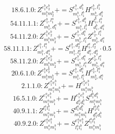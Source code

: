 \documentclass[letterpaper,10pt,fleqn,leqno,onecolumn]{article}
\begin{document}
\begin{equation} \;\;\;\;\;\;  18.6.1.0: Z^{e_{1}^{b}e_{2}^{b}}_{m_{1}^{b}m_{2}^{b}}+=S^{e_{1}^{b},d_{1}^{b}}_{m_{1}^{b},l_{1}^{b}}H^{e_{2}^{b},l_{1}^{b}}_{m_{2}^{b},d_{1}^{b}} \end{equation}
\begin{equation} \;\;\;\;\;\;  54.11.1.1: Z^{e_{1}^{b},l_{1}^{a}}_{m_{1}^{b},d_{1}^{a}}+=S^{e_{1}^{b},d_{1}^{b}}_{m_{1}^{b},l_{1}^{b}}H^{l_{1}^{b},l_{1}^{a}}_{d_{1}^{b},d_{1}^{a}} \end{equation}
\begin{equation} \;\;\;\;\;\;  54.11.2.0: Z^{e_{1}^{b}e_{2}^{b}}_{m_{1}^{b}m_{2}^{b}}+=S^{e_{1}^{b},d_{1}^{a}}_{m_{1}^{b},l_{1}^{a}}Z^{e_{2}^{b},l_{1}^{a}}_{m_{2}^{b},d_{1}^{a}} \end{equation}
\begin{equation} \;\;\;\;\;\;  58.11.1.1: Z^{e_{1}^{b},l_{1}^{a}}_{m_{1}^{b},d_{1}^{a}}+=S^{e_{1}^{b},d_{2}^{a}}_{m_{1}^{b},l_{2}^{a}}H^{l_{1}^{a},l_{2}^{a}}_{d_{1}^{a},d_{2}^{a}}\cdot 0.5 \end{equation}
\begin{equation} \;\;\;\;\;\;  58.11.2.0: Z^{e_{1}^{b}e_{2}^{b}}_{m_{1}^{b}m_{2}^{b}}+=S^{e_{1}^{b},d_{1}^{a}}_{m_{1}^{b},l_{1}^{a}}Z^{e_{2}^{b},l_{1}^{a}}_{m_{2}^{b},d_{1}^{a}} \end{equation}
\begin{equation} \;\;\;\;\;\;  20.6.1.0: Z^{e_{1}^{b}e_{2}^{b}}_{m_{1}^{b}m_{2}^{b}}+=S^{e_{1}^{b},d_{1}^{a}}_{m_{1}^{b},l_{1}^{a}}H^{e_{2}^{b},l_{1}^{a}}_{m_{2}^{b},d_{1}^{a}} \end{equation}
\begin{equation} \;\;\;\;\;\;  2.1.1.0: Z^{e_{1}^{a}e_{1}^{b}}_{m_{1}^{a}m_{1}^{b}}+=H^{e_{1}^{a}e_{1}^{b}}_{m_{1}^{a}m_{1}^{b}} \end{equation}
\begin{equation} \;\;\;\;\;\;  16.5.1.0: Z^{e_{1}^{a}e_{1}^{b}}_{m_{1}^{a}m_{1}^{b}}+=H^{e_{1}^{a}e_{1}^{b}}_{d_{1}^{a}d_{1}^{b}}S^{d_{1}^{a}d_{1}^{b}}_{m_{1}^{a}m_{1}^{b}} \end{equation}
\begin{equation} \;\;\;\;\;\;  40.9.1.1: Z^{l_{1}^{a}l_{1}^{b}}_{m_{1}^{a}m_{1}^{b}}+=S^{d_{1}^{a}d_{1}^{b}}_{m_{1}^{a}m_{1}^{b}}H^{l_{1}^{a}l_{1}^{b}}_{d_{1}^{a}d_{1}^{b}} \end{equation}
\begin{equation} \;\;\;\;\;\;  40.9.2.0: Z^{e_{1}^{a}e_{1}^{b}}_{m_{1}^{a}m_{1}^{b}}+=S^{e_{1}^{a}e_{1}^{b}}_{l_{1}^{a}l_{1}^{b}}Z^{l_{1}^{a}l_{1}^{b}}_{m_{1}^{a}m_{1}^{b}} \end{equation}
\end{document}
